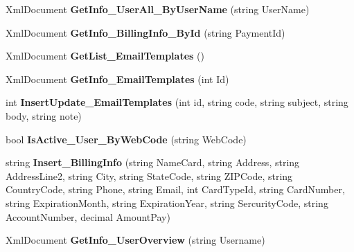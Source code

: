 \begin{DoxyCompactItemize}
\item 
\hypertarget{class_data_service_a53cfbc56c02411ee0e4e4c8bacc11011}{Xml\-Document {\bfseries Get\-Info\-\_\-\-User\-All\-\_\-\-By\-User\-Name} (string User\-Name)}\label{class_data_service_a53cfbc56c02411ee0e4e4c8bacc11011}

\item 
\hypertarget{class_data_service_a79bde97cde64a0c63bfe46bc0ff792e5}{Xml\-Document {\bfseries Get\-Info\-\_\-\-Billing\-Info\-\_\-\-By\-Id} (string Payment\-Id)}\label{class_data_service_a79bde97cde64a0c63bfe46bc0ff792e5}

\item 
\hypertarget{class_data_service_acaf3126ea837032818951512ce95e8fd}{Xml\-Document {\bfseries Get\-List\-\_\-\-Email\-Templates} ()}\label{class_data_service_acaf3126ea837032818951512ce95e8fd}

\item 
\hypertarget{class_data_service_a1d7b5494f9c4716f965aeeb61763b3f0}{Xml\-Document {\bfseries Get\-Info\-\_\-\-Email\-Templates} (int Id)}\label{class_data_service_a1d7b5494f9c4716f965aeeb61763b3f0}

\item 
\hypertarget{class_data_service_a1f952e33f7595d80c902b0d52619ca9e}{int {\bfseries Insert\-Update\-\_\-\-Email\-Templates} (int id, string code, string subject, string body, string note)}\label{class_data_service_a1f952e33f7595d80c902b0d52619ca9e}

\item 
\hypertarget{class_data_service_a156854e6edb88cc7df5f3878246c3481}{bool {\bfseries Is\-Active\-\_\-\-User\-\_\-\-By\-Web\-Code} (string Web\-Code)}\label{class_data_service_a156854e6edb88cc7df5f3878246c3481}

\item 
\hypertarget{class_data_service_a0c07ab862e2dfd87bf1197b7df5e1a90}{string {\bfseries Insert\-\_\-\-Billing\-Info} (string Name\-Card, string Address, string Address\-Line2, string City, string State\-Code, string Z\-I\-P\-Code, string Country\-Code, string Phone, string Email, int Card\-Type\-Id, string Card\-Number, string Expiration\-Month, string Expiration\-Year, string Sercurity\-Code, string Account\-Number, decimal Amount\-Pay)}\label{class_data_service_a0c07ab862e2dfd87bf1197b7df5e1a90}

\item 
\hypertarget{class_data_service_a4838eb8b7d4979502fa6e218762f4cbc}{Xml\-Document {\bfseries Get\-Info\-\_\-\-User\-Overview} (string Username)}\label{class_data_service_a4838eb8b7d4979502fa6e218762f4cbc}


\end{DoxyCompactItemize}
